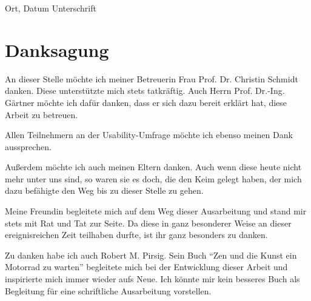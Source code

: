 \vspace{4cm}

\hspace{2cm} Ort, Datum \hfill Unterschrift \hspace{2cm}


\newpage

\section*{Danksagung}

An dieser Stelle möchte ich  meiner Betreuerin Frau Prof. Dr. Christin Schmidt danken. Diese unterstützte mich stets tatkräftig. Auch Herrn Prof. Dr.-Ing. Gärtner möchte ich dafür danken, dass er sich dazu bereit erklärt hat, diese Arbeit zu betreuen. 

Allen Teilnehmern an der Usability-Umfrage möchte ich ebenso meinen Dank aussprechen.

Außerdem möchte ich auch  meinen Eltern danken. Auch wenn diese heute nicht mehr unter uns sind, so waren sie es doch, die den Keim gelegt haben, der mich dazu befähigte den Weg bis zu dieser Stelle zu gehen.

Meine Freundin begleitete mich auf dem Weg dieser Ausarbeitung und stand mir stets mit Rat und Tat zur Seite. Da diese in ganz besonderer Weise an dieser ereignisreichen Zeit teilhaben durfte, ist ihr ganz besonders zu danken.

Zu danken habe ich auch Robert M. Pirsig. Sein Buch "`Zen und die Kunst ein Motorrad zu warten"' begleitete mich bei der Entwicklung dieser Arbeit und inspirierte mich immer wieder aufs Neue. Ich könnte mir kein besseres Buch als Begleitung für eine schriftliche Ausarbeitung vorstellen.



